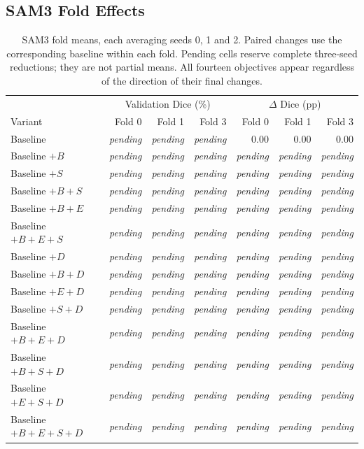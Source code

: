 \documentclass[12pt,a4paper]{article}
\newcommand{\samPending}{\textit{pending}}
\begin{document}
\subsection{SAM3 Fold Effects}

\begin{table}[htbp]
\centering\small{}
\setlength{\tabcolsep}{5pt}
\renewcommand{\arraystretch}{1.12}
\begin{tabular}{@{}lrrrrrr@{}}
\hline
 & \multicolumn{3}{c}{Validation Dice (\%)} & \multicolumn{3}{c}{$\Delta$ Dice (pp)} \\
Variant & Fold 0 & Fold 1 & Fold 3 & Fold 0 & Fold 1 & Fold 3 \\
\hline
Baseline & \samPending & \samPending & \samPending & 0.00 & 0.00 & 0.00 \\
Baseline $+B$ & \samPending & \samPending & \samPending & \samPending & \samPending & \samPending \\
Baseline $+S$ & \samPending & \samPending & \samPending & \samPending & \samPending & \samPending \\
Baseline $+B+S$ & \samPending & \samPending & \samPending & \samPending & \samPending & \samPending \\
Baseline $+B+E$ & \samPending & \samPending & \samPending & \samPending & \samPending & \samPending \\
Baseline $+B+E+S$ & \samPending & \samPending & \samPending & \samPending & \samPending & \samPending \\
Baseline $+D$ & \samPending & \samPending & \samPending & \samPending & \samPending & \samPending \\
Baseline $+B+D$ & \samPending & \samPending & \samPending & \samPending & \samPending & \samPending \\
Baseline $+E+D$ & \samPending & \samPending & \samPending & \samPending & \samPending & \samPending \\
Baseline $+S+D$ & \samPending & \samPending & \samPending & \samPending & \samPending & \samPending \\
Baseline $+B+E+D$ & \samPending & \samPending & \samPending & \samPending & \samPending & \samPending \\
Baseline $+B+S+D$ & \samPending & \samPending & \samPending & \samPending & \samPending & \samPending \\
Baseline $+E+S+D$ & \samPending & \samPending & \samPending & \samPending & \samPending & \samPending \\
Baseline $+B+E+S+D$ & \samPending & \samPending & \samPending & \samPending & \samPending & \samPending \\
\hline
\end{tabular}
\caption{SAM3 fold means, each averaging seeds 0, 1 and 2. Paired changes
use the corresponding baseline within each fold. Pending cells reserve
complete three-seed reductions; they are not partial means. All fourteen
objectives appear regardless of the direction of their final changes.}
\label{tab:sam3-geo-folds}
\end{table}
\end{document}

